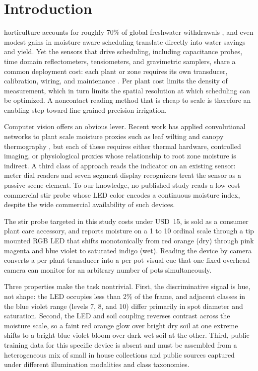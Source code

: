 ﻿\documentclass[journal]{IEEEtran}
\begin{document}
\section{Introduction}
 horticulture accounts for roughly 70\% of global freshwater withdrawals \cite{fao2020}, and even modest gains in moisture aware scheduling translate directly into water savings and yield. Yet the sensors that drive scheduling, including capacitance probes, time domain reflectometers, tensiometers, and gravimetric samplers, share a common deployment cost: each plant or zone requires its own transducer, calibration, wiring, and maintenance \cite{lekshmi2014,kashyap2021}. Per plant cost limits the density of measurement, which in turn limits the spatial resolution at which scheduling can be optimized. A noncontact reading method that is cheap to scale is therefore an enabling step toward fine grained precision irrigation.

Computer vision offers an obvious lever. Recent work has applied convolutional networks to plant scale moisture proxies such as leaf wilting \cite{kaneda2017} and canopy thermography \cite{garciatejero2018}, but each of these requires either thermal hardware, controlled imaging, or physiological proxies whose relationship to root zone moisture is indirect. A third class of approach reads the indicator on an existing sensor: meter dial readers \cite{liu2019} and seven segment display recognizers \cite{salomon2022} treat the sensor as a passive scene element. To our knowledge, no published study reads a low cost commercial stir probe whose LED color encodes a continuous moisture index, despite the wide commercial availability of such devices.

The stir probe targeted in this study costs under USD~15, is sold as a consumer plant care accessory, and reports moisture on a 1 to 10 ordinal scale through a tip mounted RGB LED that shifts monotonically from red orange (dry) through pink magenta and blue violet to saturated indigo (wet). Reading the device by camera converts a per plant transducer into a per pot visual cue that one fixed overhead camera can monitor for an arbitrary number of pots simultaneously.

Three properties make the task nontrivial. First, the discriminative signal is hue, not shape: the LED occupies less than 2\% of the frame, and adjacent classes in the blue violet range (levels 7, 8, and 10) differ primarily in spot diameter and saturation. Second, the LED and soil coupling reverses contrast across the moisture scale, so a faint red orange glow over bright dry soil at one extreme shifts to a bright blue violet bloom over dark wet soil at the other. Third, public training data for this specific device is absent and must be assembled from a heterogeneous mix of small in house collections and public sources captured under different illumination modalities and class taxonomies.
\end{document}
